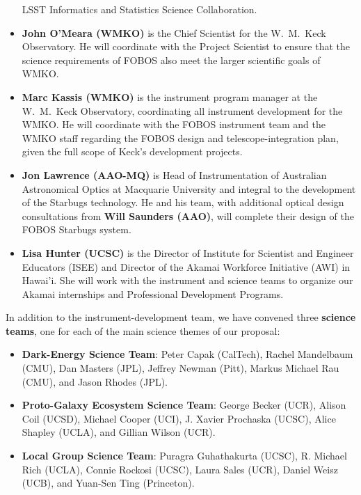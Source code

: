 \documentclass[oneside,11pt]{amsart}
\begin{document}
\begin{itemize}
LSST Informatics and Statistics Science Collaboration.\\[-5pt]
%
\item {\bf John O'Meara (WMKO)} is the Chief Scientist for the
W.~M.~Keck Observatory.  He will coordinate with the Project Scientist
to ensure that the science requirements of FOBOS also meet the larger
scientific goals of WMKO.\\[-5pt]
%
\item {\bf Marc Kassis (WMKO)} is the instrument program manager at the
W.~M.~Keck Observatory, coordinating all instrument development for the
WMKO.  He will coordinate with the FOBOS instrument team and the WMKO
staff regarding the FOBOS design and telescope-integration plan, given
the full scope of Keck's development projects.\\[-5pt]
%
\item {\bf Jon Lawrence (AAO-MQ)} is Head of Instrumentation of
Australian Astronomical Optics at Macquarie University and integral to
the development of the Starbugs technology.  He and his team, with
additional optical design consultations from {\bf Will Saunders (AAO)},
will complete their design of the FOBOS Starbugs system.\\[-5pt]
%
\item {\bf Lisa Hunter (UCSC)} is the Director of Institute for
Scientist and Engineer Educators (ISEE) and Director of the Akamai
Workforce Initiative (AWI) in Hawai'i. She will work with the instrument
and science teams to organize our Akamai internships and Professional
Development Programs.
%
\end{itemize}

\newpage

\noindent In addition to the instrument-development team, we have
convened three {\bf science teams}, one for each of the main science
themes of our proposal:
%
\begin{itemize}
%
\item {\bf Dark-Energy Science Team}: Peter Capak (CalTech), Rachel
Mandelbaum (CMU), Dan Masters (JPL), Jeffrey Newman (Pitt), Markus
Michael Rau (CMU), and Jason Rhodes (JPL).\\[-5pt]
%
\item {\bf Proto-Galaxy Ecosystem Science Team}: George Becker (UCR),
Alison Coil (UCSD), Michael Cooper (UCI), J. Xavier Prochaska (UCSC),
Alice Shapley (UCLA), and Gillian Wilson (UCR).\\[-5pt]
%
\item {\bf Local Group Science Team}: Puragra Guhathakurta (UCSC), R.
Michael Rich (UCLA), Connie Rockosi (UCSC), Laura Sales (UCR), Daniel
Weisz (UCB), and Yuan-Sen Ting (Princeton).
%
\end{itemize}
\end{document}
